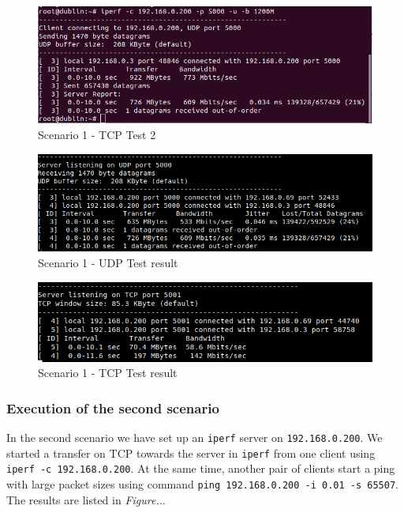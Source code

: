 \documentclass{article}
\begin{document}
\begin{figure}[H]
\includegraphics[width=14cm]{figures/q2-2-1-tcp-2.png}
\centering
\caption{Scenario 1 - TCP Test 2}
\centering
\label{fig:throughput_tcp_test_2}
\end{figure}


\begin{figure}[H]
\includegraphics[width=14cm]{figures/q2-2-1-udp-result.png}
\centering
\caption{Scenario 1 - UDP Test result}
\centering
\label{fig:throughput_udp_result}
\end{figure}


\begin{figure}[H]
\includegraphics[width=14cm]{figures/q2-2-1-tcp-result.png}
\centering
\caption{Scenario 1 - TCP Test result}
\centering
\label{fig:throughput_tcp_result}
\end{figure}



\subsubsection{Execution of the second scenario}
In the second scenario we have set up an \texttt{iperf} server on \texttt{192.168.0.200}. We started a transfer on TCP towards the server in \texttt{iperf} from one client using \texttt{iperf -c 192.168.0.200}. At the same time, another pair of clients start a ping with large packet sizes using command \texttt{ping 192.168.0.200 -i 0.01 -s 65507}. The results are listed in \textit{Figure..}.
\end{document}
